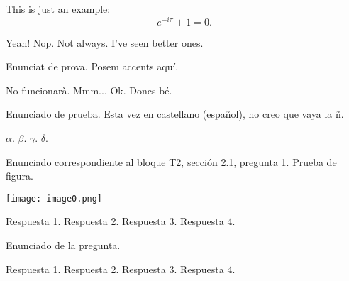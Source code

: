 This is just an example:
\begin{equation}
e^{-i\pi} + 1 = 0.
\end{equation}
\begin{enumerate}
\Myitem Yeah! %
\Myitem Nop. %
\Myitem Not always. %
\Myitem I've seen better ones. %
\end{enumerate}

Enunciat de prova. Posem accents aquí.
\begin{enumerate}
\Myitem No funcionarà. %
\Myitem Mmm... %
\Myitem Ok. %
\Myitem Doncs bé. %
\end{enumerate}

Enunciado de prueba. Esta vez en castellano (español), no creo que
vaya la ñ.
\begin{enumerate}
\Myitem $\alpha$. %
\Myitem $\beta$. %
\Myitem $\gamma$. %
\Myitem $\delta$. %
\end{enumerate}

\graphicspath{{/home/jm/Escritorio/prueba/figs/}}
Enunciado correspondiente al bloque T2, sección 2.1, pregunta
1. Prueba de figura.
\begin{center}
\texttt{[image: image0.png]}
\end{center}
\begin{enumerate}
\Myitem Respuesta 1.%
\Myitem Respuesta 2. %
\Myitem Respuesta 3. %
\Myitem Respuesta 4. %
\end{enumerate}

Enunciado de la pregunta.
\begin{enumerate}
\Myitem Respuesta 1.%
\Myitem Respuesta 2. %
\Myitem Respuesta 3. %
\Myitem Respuesta 4. %
\end{enumerate}

